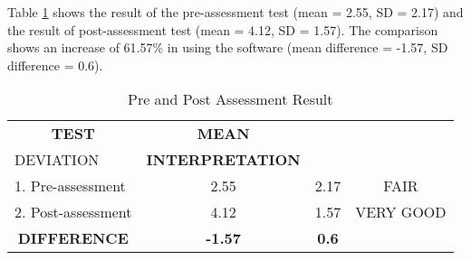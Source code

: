 \parx
Table \ref{table:pre_post} shows the result of the pre-assessment test
(mean = 2.55, SD = 2.17) and the result of post-assessment test
(mean = 4.12, SD = 1.57). The comparison shows an increase of 61.57\% in using
the software (mean difference = -1.57, SD difference = 0.6).

\begin{longtable}[c]{lccc}
\caption{Pre and Post Assessment Result}
\label{table:pre_post}\\ \hline
\multicolumn{1}{c}{\textbf{TEST}}       & \textbf{MEAN}  & \textbf{\begin{tabular}[c]{@{}c@{}}STANDARD\\ DEVIATION\end{tabular}} & \textbf{INTERPRETATION} \\ \hline
\endfirsthead
%
\endhead
%
1. Pre-assessment                       & 2.55           & 2.17                                                                  & FAIR                    \\
2. Post-assessment                      & 4.12           & 1.57                                                                  & VERY GOOD               \\
\multicolumn{1}{c}{\textbf{DIFFERENCE}} & \textbf{-1.57} & \textbf{0.6}                                                          & \textbf{}              \\ \hline
\end{longtable}
